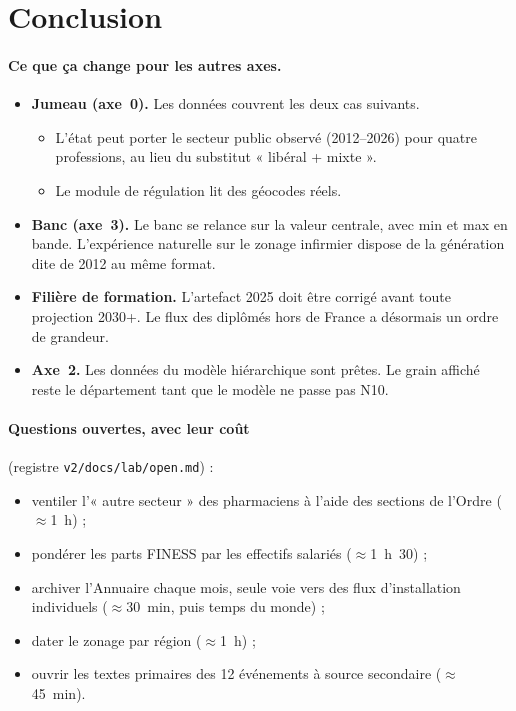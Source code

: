 \section{Conclusion}
\paragraph{Ce que ça change pour les autres axes.}
\begin{itemize}
  \item \textbf{Jumeau (axe~0).} Les données couvrent les deux cas suivants.
  \begin{itemize}
    \item L'état peut porter le secteur public observé (2012--2026) pour quatre professions, au lieu du
    substitut « libéral + mixte ».
    \item Le module de régulation lit des géocodes réels.
  \end{itemize}
  \item \textbf{Banc (axe~3).} Le banc se relance sur la valeur centrale, avec min et max en bande. L'expérience
  naturelle sur le zonage infirmier dispose de la génération dite de 2012 au même format.
  \item \textbf{Filière de formation.} L'artefact 2025 doit être corrigé avant toute projection 2030+. Le flux
  des diplômés hors de France a désormais un ordre de grandeur.
  \item \textbf{Axe~2.} Les données du modèle hiérarchique sont prêtes. Le grain affiché reste le département tant
  que le modèle ne passe pas N10.
\end{itemize}

\paragraph{Questions ouvertes, avec leur coût} (registre \texttt{v2/docs/lab/open.md}) :
\begin{itemize}
  \item ventiler l'« autre secteur » des pharmaciens à l'aide des sections de l'Ordre (\(\approx\)1~h) ;
  \item pondérer les parts FINESS par les effectifs salariés (\(\approx\)1~h~30) ;
  \item archiver l'Annuaire chaque mois, seule voie vers des flux d'installation individuels (\(\approx\)30~min,
  puis temps du monde) ;
  \item dater le zonage par région (\(\approx\)1~h) ;
  \item ouvrir les textes primaires des 12 événements à source secondaire (\(\approx\)45~min).
\end{itemize}



